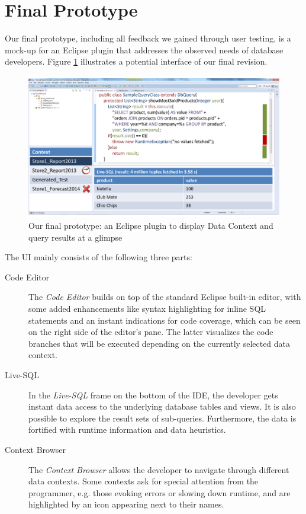 
\section[Final Prototype (Author: Fabian Tschirschnitz)]{Final Prototype}
\label{sec:FINAL_PROTOTYPE}
Our final prototype, including all feedback we gained through user testing, is a mock-up for an Eclipse plugin that addresses the observed needs of database developers. Figure \ref{fig:final_prototype_overview} illustrates a potential interface of our final revision.
\begin{figure}
\begin{centering}
    \includegraphics[width=1.0\linewidth]{images/final_prototype}
    \caption{Our final prototype: an Eclipse plugin to display Data Context and query results at a glimpse}
    \label{fig:final_prototype_overview}
\end{centering}
\end{figure}
The UI mainly consists of the following three parts:
\begin{description}
	\item [Code Editor] The \emph{Code Editor} builds on top of the standard Eclipse built-in editor, with some added enhancements like syntax highlighting for inline SQL statements and an instant indications for code coverage, which can be seen on the right side of the editor's pane. The latter visualizes the code branches that will be executed depending on the currently selected data context.
	\item [Live-SQL] In the \emph{Live-SQL} frame on the bottom of the IDE, the developer gets instant data access to the underlying database tables and views. It is also possible to explore the result sets of sub-queries. Furthermore, the data is fortified with runtime information and data heuristics. %
	\item [Context Browser] The \emph{Context Browser} allows the developer to navigate through different data contexts. Some contexts ask for special attention from the programmer, e.g. those evoking errors or slowing down runtime, and are highlighted by an icon appearing next to their names. %
\end{description}
